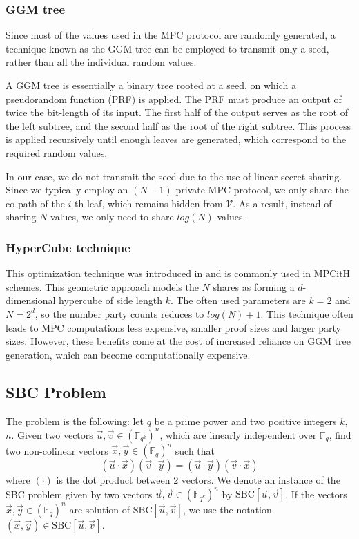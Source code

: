 \documentclass[english]{article}
\begin{document}
		\subsubsection{GGM tree}
		Since most of the values used in the MPC protocol are randomly generated, a technique known as the GGM tree can be employed to transmit only a seed, rather than all the individual random values.
		
		A GGM tree is essentially a binary tree rooted at a seed, on which a pseudorandom function (PRF) is applied. The PRF must produce an output of twice the bit-length of its input. The first half of the output serves as the root of the left subtree, and the second half as the root of the right subtree. This process is applied recursively until enough leaves are generated, which correspond to the required random values.
		
		In our case, we do not transmit the seed due to the use of linear secret sharing. Since we typically employ an $(N-1)$-private MPC protocol, we only share the co-path of the $i$-th leaf, which remains hidden from $\mathcal{V}$. As a result, instead of sharing $N$ values, we only need to share $log(N)$ values.
		
		\subsubsection{HyperCube technique}
 		This optimization technique was introduced in \cite{AGHH+22} and is commonly used in MPCitH schemes. This geometric approach models the $N$ shares as forming a $d$-dimensional hypercube of side length $k$. The often used parameters are $k = 2$ and $N = 2^d$, so the number party counts reduces to $log(N) + 1$. This technique often leads to MPC computations less expensive, smaller proof sizes and larger party sizes. However, these benefits come at the cost of increased reliance on GGM tree generation, which can become computationally expensive.
		
		\subsection{SBC Problem}
		The problem is the following: let $q$ be a prime power and two positive integers $k$, $n$.
		\newline
		Given two vectors $\vec{u}, \vec{v} \in (\mathbb{F}_{q^k})^n$, which are linearly independent over $\mathbb{F}_q$, find two non-colinear vectors $\vec{x}, \vec{y} \in (\mathbb{F}_q)^n$ such that $$(\vec{u} \cdot \vec{x})(\vec{v} \cdot \vec{y}) = (\vec{u} \cdot \vec{y})(\vec{v} \cdot \vec{x})$$
		where $(\cdot)$ is the dot product between 2 vectors.
		We denote an instance of the SBC problem given by two vectors $\vec{u}, \vec{v} \in (\mathbb{F}_{q^k})^n$ by $\text{SBC}[\vec{u}, \vec{v}]$. If the vectors $\vec{x},\vec{y} \in (\mathbb{F}_q)^n$ are solution of $\text{SBC}[\vec{u},\vec{v}]$, we use the notation $(\vec{x}, \vec{y}) \in \text{SBC}[\vec{u}, \vec{v}]$.
		
\end{document}
